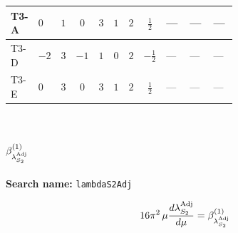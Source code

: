 \documentclass[8pt]{article}
\begin{document}
\begin{landscape}
\begin{longtable}{@{}llcccccc >{\raggedright\arraybackslash}p{0.21\linewidth} >{\raggedright\arraybackslash}p{0.21\linewidth} >{\raggedright\arraybackslash}p{0.21\linewidth}@{}}
\midrule
T3-A & $0$ & $1$ & $0$ & $3$ & $1$ & $2$ & $\frac{1}{2}$ & --- & --- & --- \\
\midrule
T3-D & $-2$ & $3$ & $-1$ & $1$ & $0$ & $2$ & $-\frac{1}{2}$ & --- & --- & --- \\
\midrule
T3-E & $0$ & $3$ & $0$ & $3$ & $1$ & $2$ & $\frac{1}{2}$ & --- & --- & --- \\
\midrule
\bottomrule
\end{longtable}
\clearpage
\section*{$\beta_{\lambda_{S_2}^{\rm Adj}}^{(1)}$}
\noindent\textbf{Search name: }\texttt{lambdaS2Adj}\par\smallskip
\[16\pi^2\,\mu\frac{d \lambda_{S_2}^{\rm Adj}}{d\mu}=\beta_{\lambda_{S_2}^{\rm Adj}}^{(1)}\]

\end{landscape}
\end{document}
